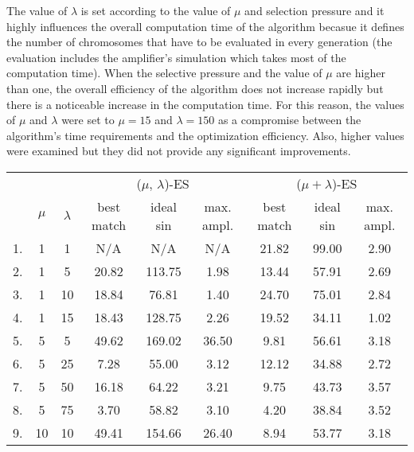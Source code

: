 The value of $\lambda$ is set according to the value of $\mu$ and selection pressure and it highly influences the overall computation time of the algorithm becasue it defines the number of chromosomes that have to be evaluated in every generation (the evaluation includes the amplifier's simulation which takes most of the computation time). When the selective pressure and the value of $\mu$ are higher than one, the overall efficiency of the algorithm does not increase rapidly but there is a noticeable increase in the computation time. For this reason, the values of $\mu$ and $\lambda$ were set to $\mu = 15$ and $\lambda = 150$ as a compromise between the algorithm's time requirements and the optimization efficiency. Also, higher values were examined but they did not provide any significant improvements.

\begin{table}[H]
\centering
\begin{tabular}{@{}ccccccccc@{}}
\toprule
    &       &           & \multicolumn{3}{c}{($\mu$, $\lambda$)-ES} & \multicolumn{3}{c}{($\mu + \lambda$)-ES} \\
   \cmidrule(lr){4-6} \cmidrule(lr){7-9}
    & $\mu$ & $\lambda$ & best match & ideal sin & max. ampl.       & best match & ideal sin  & max. ampl.     \\
   \midrule
1.  & 1     & 1         & N/A        & N/A       & N/A              & 21.82      & 99.00      & 2.90           \\
2.  & 1     & 5         & 20.82      & 113.75    & 1.98             & 13.44      & 57.91      & 2.69           \\
3.  & 1     & 10        & 18.84      & 76.81     & 1.40             & 24.70      & 75.01      & 2.84           \\
4.  & 1     & 15        & 18.43      & 128.75    & 2.26             & 19.52      & 34.11      & 1.02           \\
5.  & 5     & 5         & 49.62      & 169.02    & 36.50            & 9.81       & 56.61      & 3.18           \\
6.  & 5     & 25        & 7.28       & 55.00     & 3.12             & 12.12      & 34.88      & 2.72           \\
7.  & 5     & 50        & 16.18      & 64.22     & 3.21             & 9.75       & 43.73      & 3.57           \\
8.  & 5     & 75        & 3.70       & 58.82     & 3.10             & 4.20       & 38.84      & 3.52           \\
9.  & 10    & 10        & 49.41      & 154.66    & 26.40            & 8.94       & 53.77      & 3.18           \\

\end{tabular}
\end{table}
